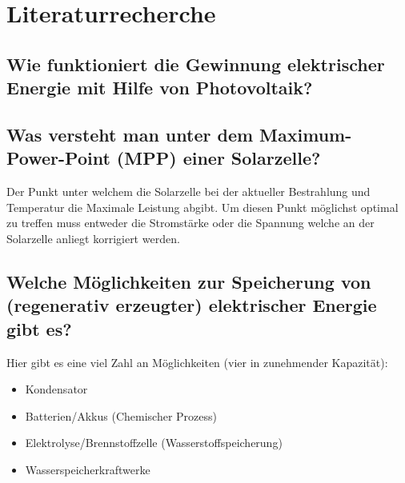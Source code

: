 \documentclass[a4paper,12pt]{article}
\title{}
\author{}
\date{}
\begin{document}
\maketitle

\section{Literaturrecherche}
\subsection{Wie funktioniert die Gewinnung elektrischer Energie mit Hilfe von Photovoltaik?}

\subsection{Was versteht man unter dem Maximum-Power-Point (MPP) einer Solarzelle?}
Der Punkt unter welchem die Solarzelle bei der aktueller Bestrahlung und Temperatur die Maximale Leistung abgibt. Um diesen Punkt möglichst optimal zu treffen muss entweder die Stromstärke oder die Spannung welche an der Solarzelle anliegt korrigiert werden.

\subsection{Welche Möglichkeiten zur Speicherung von (regenerativ erzeugter) elektrischer Energie gibt es?}
Hier gibt es eine viel Zahl an Möglichkeiten (vier in zunehmender Kapazität):
\begin{itemize}
 \item Kondensator
 \item Batterien/Akkus (Chemischer Prozess)
 \item Elektrolyse/Brennstoffzelle (Wasserstoffspeicherung)
 \item Wasserspeicherkraftwerke 
\end{itemize}
\end{document}
